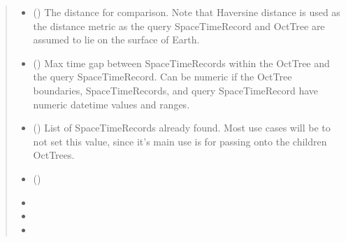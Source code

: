 \documentclass[letterpaper,10pt,english]{sphinxmanual}
\begin{document}
\begin{fulllineitems}
\begin{fulllineitems}
\begin{quote}
\begin{description}
\begin{itemize}
\item {} 
\sphinxAtStartPar
{} () \textendash{} The distance for comparison. Note that Haversine distance is used
as the distance metric as the query SpaceTimeRecord and OctTree are
assumed to lie on the surface of Earth.

\item {} 
\sphinxAtStartPar
{} () \textendash{} Max time gap between SpaceTimeRecords within the OctTree and the
query SpaceTimeRecord. Can be numeric if the OctTree boundaries,
SpaceTimeRecords, and query SpaceTimeRecord have numeric datetime
values and ranges.

\item {} 
\sphinxAtStartPar
{} ({\hyperref[\detokenize{users_guide:GeoSpatialTools.octtree.SpaceTimeRecords}]{}}\sphinxstyleliteralemphasis{\sphinxupquote{ | }}) \textendash{} List of SpaceTimeRecords already found. Most use cases will be to
not set this value, since it’s main use is for passing onto the
children OctTrees.

\end{itemize}

\sphinxAtStartPar
{}

\sphinxAtStartPar
\begin{itemize}
\item {} 
\sphinxAtStartPar
{} ()

\item {} 
\sphinxAtStartPar
{}

\item {} 
\sphinxAtStartPar
{}

\item {} 
\sphinxAtStartPar
{}


\end{itemize}
\end{description}
\end{quote}
\end{fulllineitems}
\end{fulllineitems}
\end{document}
